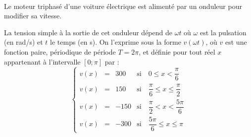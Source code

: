 \documentclass[11pt,a4paper]{article}
\begin{document}
\newpage
\\[2mm]

Le moteur triphasé d'une voiture électrique est alimenté par un onduleur pour modifier sa vitesse.

La tension simple à la sortie de cet onduleur dépend de $\omega t$ où $\omega$ est la pulsation (en rad/s) et $t$ le temps (en s). On l'exprime sous la forme $v(\omega t)$, où $v$ est une fonction paire, périodique de période $T = 2\pi$, et définie pour tout réel $x$ appartenant à l'intervalle $[0;\pi]$ par :
\[\left\{\begin{array}{lcll}
v(x) &=& 300  &\text{si}\quad 0 \leqslant x < \dfrac{\pi}{6} \\[6pt]
v(x) &=& 150  &\text{si}\quad \dfrac{\pi}{6} \leqslant x \leqslant \dfrac{\pi}{2}\\[6pt]
v(x) &=& -150 &\text{si}\quad \dfrac{\pi}{2} < x < \dfrac{5\pi}{6}\\[6pt]
v(x) &=& -300 &\text{si}\quad \dfrac{5\pi}{6} \leqslant x \leqslant \pi
\end{array}\right.\]

\medskip
\end{document}
